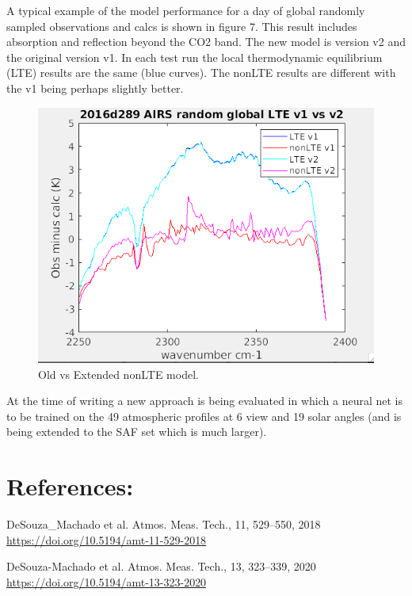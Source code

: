 \documentclass[11pt,twocolumn]{article}
\begin{document}
A typical example of the model performance for a day of global randomly
sampled observations and calcs is shown in figure 7. This result includes
absorption and reflection beyond the CO2 band. The new model is version v2
and the original version v1. In each test run the local thermodynamic equilibrium (LTE)
results are the same (blue curves). The nonLTE results are different with the
v1 being perhaps slightly better.

\begin{figure}[htbp]
\centering
\includegraphics[width=\linewidth]{./Figs/airs_oc_bias_random_day_nlte.png}
\caption{\label{fig:org7e04f96}Old vs Extended nonLTE model.}
\end{figure}

At the time of writing a new approach is being evaluated in which a neural net
is to be trained on the 49 atmospheric profiles at 6 view and 19 solar angles
(and is being extended to the SAF set which is much larger). 


\section{References:}
\label{sec:org63b33b2}
DeSouza\_Machado et al. Atmos. Meas. Tech., 11, 529–550, 2018
\url{https://doi.org/10.5194/amt-11-529-2018}

DeSouza-Machado et al. Atmos. Meas. Tech., 13, 323–339, 2020
\url{https://doi.org/10.5194/amt-13-323-2020}
\end{document}
